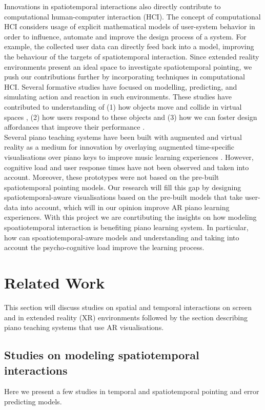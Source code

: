 \documentclass[manuscript,screen]{acmart}
\begin{document}
Innovations in spatiotemporal interactions also directly contribute to computational human-computer interaction (HCI). The concept of computational HCI considers usage of explicit mathematical models of user-system behavior in order to influence, automate and improve the design process of a system. For example, the collected user data can directly feed back into a model, improving the behaviour of the targets of spatiotemporal interaction. Since extended reality environments present an ideal space to investigate spatiotemporal pointing, we push our contributions further by incorporating techniques in computational HCI. Several formative studies have focused on modelling, predicting, and simulating action and reaction in such environments. These studies have contributed to understanding of (1) how objects move and collide in virtual spaces \cite{lee2017boxer}, (2) how users respond to these objects \cite{lee2016modelling} and (3) how we can foster design affordances that improve their performance \cite{rogers2014piano}.\\

Several piano teaching systems have been built with augmented and virtual reality as a medium for innovation by overlaying augmented time-specific visualisations over piano keys to improve music learning experiences \cite{rogers2014piano, sun2018mr, birhanu2017keynvision}. However, cognitive load and user response times have not been observed and taken into account. Moreover, these prototypes were not based on the pre-built spatiotemporal pointing models. Our research will fill this gap by designing spatiotemporal-aware visualisations based on the pre-built models that take user-data into account, which will in our opinion improve AR piano learning experiences. With this project we are conrtibuting the insights on how modeling spoatiotemporal interaction is benefiting piano learning system. In particular, how can spoatiotemporal-aware models and understanding and taking into account the psycho-cognitive load improve the learning process. 

\section{Related Work}
This section will discuss studies on spatial and temporal interactions on screen and in extended reality (XR) environments followed by the section describing piano teaching systems that use AR visualisations. 

\subsection{Studies on modeling spatiotemporal interactions}
Here we present a few studies in temporal and spatiotemporal pointing and error predicting models. 
\end{document}
